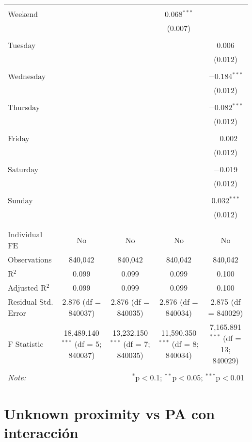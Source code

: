 \documentclass[
]{article}
\begin{document}
\begin{table}[!htbp]
{\begin{tabular}{@{\extracolsep{5pt}}lcccc}
  & & & & \\ 
 Weekend &  &  & 0.068$^{***}$ &  \\ 
  &  &  & (0.007) &  \\ 
  & & & & \\ 
 Tuesday &  &  &  & 0.006 \\ 
  &  &  &  & (0.012) \\ 
  & & & & \\ 
 Wednesday &  &  &  & $-$0.184$^{***}$ \\ 
  &  &  &  & (0.012) \\ 
  & & & & \\ 
 Thursday &  &  &  & $-$0.082$^{***}$ \\ 
  &  &  &  & (0.012) \\ 
  & & & & \\ 
 Friday &  &  &  & $-$0.002 \\ 
  &  &  &  & (0.012) \\ 
  & & & & \\ 
 Saturday &  &  &  & $-$0.019 \\ 
  &  &  &  & (0.012) \\ 
  & & & & \\ 
 Sunday &  &  &  & 0.032$^{***}$ \\ 
  &  &  &  & (0.012) \\ 
  & & & & \\ 
\hline \\[-1.8ex] 
Individual FE & No & No & No & No \\ 
Observations & 840,042 & 840,042 & 840,042 & 840,042 \\ 
R$^{2}$ & 0.099 & 0.099 & 0.099 & 0.100 \\ 
Adjusted R$^{2}$ & 0.099 & 0.099 & 0.099 & 0.100 \\ 
Residual Std. Error & 2.876 (df = 840037) & 2.876 (df = 840035) & 2.876 (df = 840034) & 2.875 (df = 840029) \\ 
F Statistic & 18,489.140$^{***}$ (df = 5; 840037) & 13,232.150$^{***}$ (df = 7; 840035) & 11,590.350$^{***}$ (df = 8; 840034) & 7,165.891$^{***}$ (df = 13; 840029) \\ 
\hline 
\hline \\[-1.8ex] 
\textit{Note:}  & \multicolumn{4}{r}{$^{*}$p$<$0.1; $^{**}$p$<$0.05; $^{***}$p$<$0.01} \\ 
\end{tabular}
} 
\end{table} 
\newpage
\section{Unknown proximity vs PA con interacción}
\end{document}
